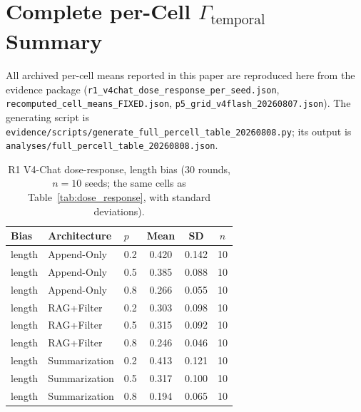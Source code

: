 \documentclass[11pt]{article}
\begin{document}




\section{Complete per-Cell $\Gamma_{\text{temporal}}$ Summary}
\label{sec:supp-full-percell}
All archived per-cell means reported in this paper are reproduced here from the evidence package (\texttt{r1\_v4chat\_dose\_response\_per\_seed.json}, \texttt{recomputed\_cell\_means\_FIXED.json}, \texttt{p5\_grid\_v4flash\_20260807.json}). The generating script is \texttt{evidence/scripts/generate\_full\_percell\_table\_20260808.py}; its output is \texttt{analyses/full\_percell\_table\_20260808.json}.

\begin{table}[htbp]
\centering
\caption{R1 V4-Chat dose-response, length bias (30 rounds, $n{=}10$ seeds; the same cells as Table~\ref{tab:dose_response}, with standard deviations).}
\label{tab:supp-full-r1}
\small
\begin{tabular}{lllccc}
\toprule
Bias & Architecture & $p$ & Mean & SD & $n$ \\
\midrule
length & Append-Only & 0.2 & 0.420 & 0.142 & 10 \\
length & Append-Only & 0.5 & 0.385 & 0.088 & 10 \\
length & Append-Only & 0.8 & 0.266 & 0.055 & 10 \\
length & RAG+Filter & 0.2 & 0.303 & 0.098 & 10 \\
length & RAG+Filter & 0.5 & 0.315 & 0.092 & 10 \\
length & RAG+Filter & 0.8 & 0.246 & 0.046 & 10 \\
length & Summarization & 0.2 & 0.413 & 0.121 & 10 \\
length & Summarization & 0.5 & 0.317 & 0.100 & 10 \\
length & Summarization & 0.8 & 0.194 & 0.065 & 10 \\
\bottomrule
\end{tabular}
\end{table}
\end{document}

